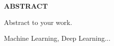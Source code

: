 \thispagestyle{plain}

\begin{center}
	{\Large \bf ABSTRACT}
\end{center}

Abstract to your work. \cite{bar}

\begin{keywords}
	Machine Learning, Deep Learning...
\end{keywords}


\clearpage